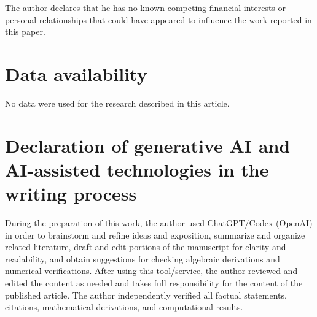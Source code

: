 \documentclass[11pt]{article}
\theoremstyle{plain}
\theoremstyle{remark}
\begin{document}
The author declares that he has no known competing financial interests or personal relationships that could have appeared to influence the work reported in this paper.

\section*{Data availability}

No data were used for the research described in this article.

\section*{Declaration of generative AI and AI-assisted technologies in the writing process}

During the preparation of this work, the author used ChatGPT/Codex (OpenAI) in order to brainstorm and refine ideas and exposition, summarize and organize related literature, draft and edit portions of the manuscript for clarity and readability, and obtain suggestions for checking algebraic derivations and numerical verifications. After using this tool/service, the author reviewed and edited the content as needed and takes full responsibility for the content of the published article. The author independently verified all factual statements, citations, mathematical derivations, and computational results.



\end{document}
